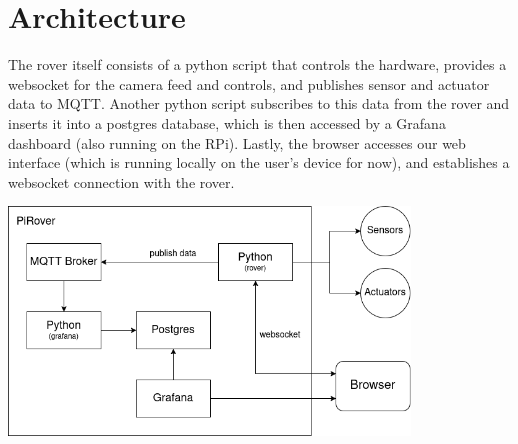 \section{Architecture}


The rover itself consists of a python script that controls the hardware, provides a websocket for the camera feed and controls, and publishes sensor and actuator data to MQTT.
Another python script subscribes to this data from the rover and inserts it into a postgres database, which is then accessed by a Grafana dashboard (also running on the RPi).
Lastly, the browser accesses our web interface (which is running locally on the user's device for now), and establishes a websocket connection with the rover.

\includegraphics[width=0.8\textwidth]{img/architecture}
